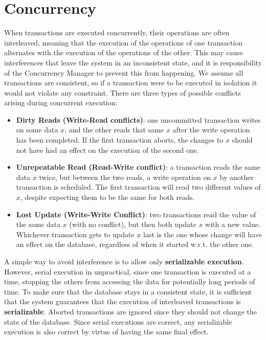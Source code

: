 \chapter{Concurrency}

When transactions are executed concurrently, their operations are often interleaved, meaning that the execution of the operations of one transaction alternates with the execution of the operations of the other. This may cause interferences that leave the system in an inconsistent state, and it is responsibility of the Concurrency Manager to prevent this from happening. We assume all transactions are consistent, so if a transaction were to be executed in isolation it would not violate any constraint. There are three types of possible conflicts arising during concurrent execution:
\begin{itemize}
    \item \textbf{Dirty Reads (Write-Read conflicts)}: one uncommitted transaction writes on some data $x$, and the other reads that same $x$ after the write operation has been completed. If the first transaction aborts, the changes to $x$ should not have had an effect on the execution of the second one.

    \item \textbf{Unrepeatable Read (Read-Write conflict)}: a transaction reads the same data $x$ twice, but between the two reads, a write operation on $x$ by another transaction is scheduled. The first transaction will read two different values of $x$, despite expecting them to be the same for both reads.

    \item \textbf{Lost Update (Write-Write Conflict)}: two transactions read the value of the same data $x$ (with no conflict), but then both update $x$ with a new value. Whichever transaction gets to update $x$ last is the one whose change will have an effect on the database, regardless of when it started w.r.t. the other one. 
\end{itemize}
A simple way to avoid interference is to allow only \textbf{serializable execution}.
However, serial execution in unpractical, since one transaction is executed at a time, stopping the others from accessing the data for potentially long periods of time. To make sure that the database stays in a consistent state, it is sufficient that the system guarantees that the execution of interleaved transactions is \textbf{serializable}.
Aborted transactions are ignored since they should not change the state of the database. Since serial executions are correct, any serializable execution is also correct by virtue of having the same final effect.

